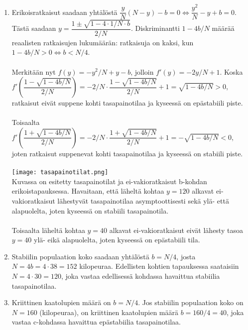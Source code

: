 \documentclass[12pt,fleqn]{article}
\begin{document}
\begin{enumerate}[label=\textbf{\arabic*.}]
\begin{enumerate}[label=\textbf{\alph*)}]
\item Erikoisratkaisut saadaan yhtälöstä \(\dfrac{y}{N}(N-y)-b=0\iff \dfrac{y^2}{N}-y+b=0\). Tästä saadaan \(y=\dfrac{1\pm \sqrt{1-4\cdot 1/N\cdot b}}{2/N}\). Diskriminantti \(1-4b/N\) määrää reaalisten ratkaisujen lukumäärän: ratkaisuja on kaksi, kun \(1-4b/N>0\iff b<N/4\).\\
 \\
Merkitään nyt \(f(y)=-y^2/N+y-b\), jolloin \(f'(y)=-2y/N+1\). Koska \(f'\left (\dfrac{1-\sqrt{1-4b/N}}{2/N} \right )=-2/N\cdot \dfrac{1-\sqrt{1-4b/N}}{2/N}+1=\sqrt{1-4b/N}>0\), ratkaisut eivät suppene kohti tasapainotilaa ja kyseessä on epästabiili piste.\\
 \\
Toisaalta \(f'\left (\dfrac{1+\sqrt{1-4b/N}}{2/N} \right )=-2/N\cdot \dfrac{1+\sqrt{1-4b/N}}{2/N}+1=-\sqrt{1-4b/N}<0\), joten ratkaisut suppenevat kohti tasapainotilaa ja kyseessä on stabiili piste.\\
 \\
\texttt{[image: tasapainotilat.png]}\\
Kuvassa on esitetty tasapainotilat ja ei-vakioratkaisut b-kohdan erikoistapauksessa. Havaitaan, että läheltä kohtaa \(y=120\) alkavat ei-vakioratkaisut lähestyvät tasapainotilaa asymptoottisesti sekä ylä- että alapuolelta, joten kyseessä on stabiili tasapainotila.\\
 \\
Toisaalta läheltä kohtaa \(y=40\) alkavat ei-vakioratkaisut eivät lähesty tasoa \(y=40\) ylä- eikä alapuolelta, joten kyseessä on epästabiili tila.

\item Stabiilin populaation koko saadaan yhtälöstä \(b=N/4\), josta \(N=4b=4\cdot 38=152\) kilopeuraa. Edellisten kohtien tapauksessa saataisiin \(N=4\cdot 30=120\), joka vastaa edellisessä kohdassa havaittua stabiilia tasapainotilaa.

\item Kriittinen kaatolupien määrä on \(b=N/4\). Jos stabiilin populaation koko on \(N=160\) (kilopeuraa), on kriittinen kaatolupien määrä \(b=160/4=40\), joka vastaa c-kohdassa havaittua epästabiilia tasapainotilaa.
\end{enumerate}
\end{enumerate}

\newpage
\end{document}
